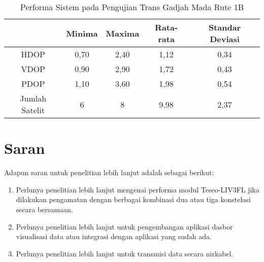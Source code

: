 \begin{enumerate}
	\begin{table}[H]
		\caption{Performa Sistem pada Pengujian Trans Gadjah Mada Rute 1B}
		\vspace{0.5em}
		\centering
		\begin{tabular}{ccccc}
			\hline
			& \textbf{Minima} & \textbf{Maxima} & \textbf{Rata-rata} & \textbf{Standar Deviasi}\\
			\hline 
			HDOP & 0,70 & 2,40 & 1,12 & 0,34\\
			VDOP & 0,90	& 2,90 & 1,72 & 0,43\\
			PDOP & 1,10	& 3,60 & 1,98 & 0,54\\
			Jumlah Satelit & 6 & 8 & 9,98 & 2,37\\
			\hline
		\end{tabular}
		\label{Tab: performa-tgm-1b}
	\end{table}
\end{enumerate}

\section{Saran}
Adapun saran untuk penelitian lebih lanjut adalah sebagai berikut:
\begin{enumerate}
	\item Perlunya penelitian lebih lanjut mengenai performa modul Teseo-LIV3FL jika dilakukan pengamatan dengan berbagai kombinasi dua atau tiga konstelasi secara bersamaan.
	\item Perlunya penelitian lebih lanjut untuk pengembangan aplikasi dasbor visualisasi data atau integrasi dengan aplikasi yang sudah ada.
	\item Perlunya penelitian lebih lanjut untuk transmisi data secara nirkabel.
\end{enumerate}

